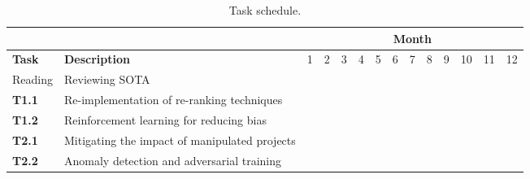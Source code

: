 \begin{table}[t!]
	\centering
	\scriptsize	
	\caption{Task schedule.}
	\begin{tabular}{|p{0.80cm}|p{5.00cm}|p{0.40cm}|p{0.40cm}|p{0.40cm}|p{0.40cm}|p{0.40cm}|p{0.40cm}|p{0.40cm}|p{0.40cm}|p{0.40cm}|p{0.40cm}|p{0.40cm}|p{0.40cm}|}  \hline
		& & \multicolumn{12}{c|}{\textbf{Month}} \\ \hline
		\textbf{Task} & \textbf{Description} & 1 & 2 & 3 & 4 & 5 & 6  & 7 & 8 & 9 &  10 & 11 & 12 \\ \hline
		Reading & Reviewing SOTA & \cellcolor{lightgray} & \cellcolor{lightgray} &  &  &  &   &  &  &  &   & \cellcolor{lightgray} &  \\ \hline
		\textbf{T1.1} & Re-implementation of re-ranking techniques &  & \cellcolor{lightgray} & \cellcolor{lightgray} &   &   &   &  &  &  &   &  &  \\ \hline
		\textbf{T1.2} & Reinforcement learning for reducing bias &  &  & \cellcolor{lightgray} & \cellcolor{lightgray} &  \cellcolor{lightgray} &  \cellcolor{lightgray}  &  &  &  &   &  &  \\ \hline
		\textbf{T2.1} & Mitigating the impact of manipulated projects &  &  &  &  &  \cellcolor{lightgray} &  \cellcolor{lightgray}  & \cellcolor{lightgray} & \cellcolor{lightgray} &  &   &  &  \\ \hline
		\textbf{T2.2} & Anomaly detection and adversarial training &  &  &   &   &   &    & \cellcolor{lightgray} & \cellcolor{lightgray}   & \cellcolor{lightgray} &  \cellcolor{lightgray} &  &  \\ \hline

\end{tabular}
\end{table}
